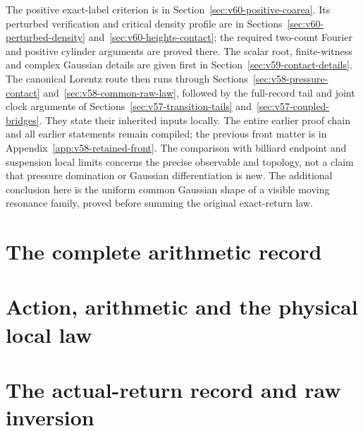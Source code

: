 \documentclass[11pt,reqno]{amsart}
\numberwithin{equation}{section}
\theoremstyle{definition}\newtheorem{definition}[theorem]{Definition}
\theoremstyle{remark}\newtheorem{remark}[theorem]{Remark}
\begin{document}
The positive exact-label criterion is in
Section~\ref{sec:v60-positive-coarea}. Its perturbed verification and
critical density profile are in Sections~\ref{sec:v60-perturbed-density}
and~\ref{sec:v60-heights-contact}; the required two-count Fourier and
positive cylinder arguments are proved there. The scalar root,
finite-witness and complex Gaussian details are given
first in Section~\ref{sec:v59-contact-details}. The canonical Lorentz
route then runs through Sections~\ref{sec:v58-pressure-contact}
and~\ref{sec:v58-common-raw-law}, followed by the full-record tail
and joint clock arguments of
Sections~\ref{sec:v57-transition-tails} and~\ref{sec:v57-coupled-bridges}.
They state their inherited inputs locally. The entire earlier proof
chain and all earlier statements remain compiled; the previous front
matter is in Appendix~\ref{app:v58-retained-front}.
The comparison with billiard endpoint and suspension local limits
\cite{DPZ,DN} concerns the precise observable and topology, not a
claim that pressure domination or Gaussian differentiation is new.
The additional conclusion here is the uniform common Gaussian shape
of a visible moving resonance family, proved before summing the
original exact-return law.

\part{The complete arithmetic record}










\part{Action, arithmetic and the physical local law}









\part{The actual-return record and raw inversion}
\end{document}
